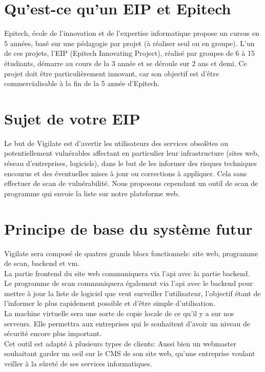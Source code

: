 \section{Qu'est-ce qu’un EIP et Epitech}
Epitech, école de l'innovation et de l'expertise informatique propose un cursus en 5 années, basé sur une pédagogie par projet (à réaliser seul ou en groupe). L'un de ces projets, l’EIP (Epitech Innovating Project), réalisé par groupes de 6 à 15 étudiants, démarre au cours de la 3\ieme{} année et se déroule sur 2 ans et demi. Ce projet doit être particulièrement innovant, car son objectif est d’être commercialisable à la fin de la 5\ieme{} année d’Epitech.

\section{Sujet de votre EIP}
Le but de Vigilate est d’avertir les utilisateurs des services obsolètes ou potentiellement vulnérables affectant en particulier leur infrastructure (sites web, réseau d'entreprises, logiciels), dans le but de les informer des risques techniques encourus et des éventuelles mises à jour ou corrections à appliquer.
Cela sans effectuer de scan de vulnérabilité.
Nous proposons cependant un outil de scan de programme qui envoie la liste sur notre plateforme web.

\section{Principe de base du système futur}
Vigilate sera composé de quatres grands blocs fonctionnels: site web, programme de scan, backend et vm.\\
La partie frontend du site web communiquera via l’api avec la partie backend.\\
Le programme de scan communiquera également via l’api avec le backend pour mettre à jour la liste de logiciel que veut surveiller l’utilisateur, l'objectif étant de l’informer le plus rapidement possible et d’être simple d’utilisation.\\
La machine virtuelle sera une sorte de copie locale de ce qu’il y a sur nos serveurs. Elle permettra aux entreprises qui le souhaitent d’avoir un niveau de sécurité encore plus important.\\
Cet outil est adapté à plusieurs types de clients: Aussi bien un webmaster souhaitant garder un oeil sur le CMS de son site web, qu’une entreprise voulant veiller à la sûreté de ses services informatiques.\\


